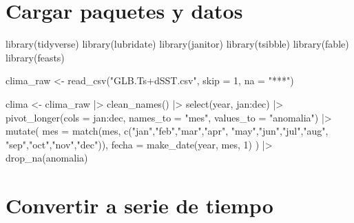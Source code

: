 \documentclass[
  letterpaper,
  DIV=11,
  numbers=noendperiod]{scrreprt}
\newenvironment{Shaded}{\begin{snugshade}}{\end{snugshade}}
\newcommand{\AttributeTok}[1]{\textcolor[rgb]{0.40,0.45,0.13}{#1}}
\newcommand{\DecValTok}[1]{\textcolor[rgb]{0.68,0.00,0.00}{#1}}
\newcommand{\FunctionTok}[1]{\textcolor[rgb]{0.28,0.35,0.67}{#1}}
\newcommand{\NormalTok}[1]{\textcolor[rgb]{0.00,0.23,0.31}{#1}}
\newcommand{\OtherTok}[1]{\textcolor[rgb]{0.00,0.23,0.31}{#1}}
\newcommand{\SpecialCharTok}[1]{\textcolor[rgb]{0.37,0.37,0.37}{#1}}
\newcommand{\StringTok}[1]{\textcolor[rgb]{0.13,0.47,0.30}{#1}}
\begin{document}
\section{Cargar paquetes y datos}\label{cargar-paquetes-y-datos-2}

\begin{Shaded}
\begin{Highlighting}[]
\FunctionTok{library}\NormalTok{(tidyverse)}
\FunctionTok{library}\NormalTok{(lubridate)}
\FunctionTok{library}\NormalTok{(janitor)}
\FunctionTok{library}\NormalTok{(tsibble)}
\FunctionTok{library}\NormalTok{(fable)}
\FunctionTok{library}\NormalTok{(feasts)}

\NormalTok{clima\_raw }\OtherTok{\textless{}{-}} \FunctionTok{read\_csv}\NormalTok{(}\StringTok{"GLB.Ts+dSST.csv"}\NormalTok{, }\AttributeTok{skip =} \DecValTok{1}\NormalTok{, }\AttributeTok{na =} \StringTok{"***"}\NormalTok{)}

\NormalTok{clima }\OtherTok{\textless{}{-}}\NormalTok{ clima\_raw }\SpecialCharTok{|\textgreater{}}
  \FunctionTok{clean\_names}\NormalTok{() }\SpecialCharTok{|\textgreater{}}
  \FunctionTok{select}\NormalTok{(year, jan}\SpecialCharTok{:}\NormalTok{dec) }\SpecialCharTok{|\textgreater{}}
  \FunctionTok{pivot\_longer}\NormalTok{(}\AttributeTok{cols =}\NormalTok{ jan}\SpecialCharTok{:}\NormalTok{dec,}
               \AttributeTok{names\_to  =} \StringTok{"mes"}\NormalTok{,}
               \AttributeTok{values\_to =} \StringTok{"anomalia"}\NormalTok{) }\SpecialCharTok{|\textgreater{}}
  \FunctionTok{mutate}\NormalTok{(}
    \AttributeTok{mes   =} \FunctionTok{match}\NormalTok{(mes, }\FunctionTok{c}\NormalTok{(}\StringTok{"jan"}\NormalTok{,}\StringTok{"feb"}\NormalTok{,}\StringTok{"mar"}\NormalTok{,}\StringTok{"apr"}\NormalTok{,}
                         \StringTok{"may"}\NormalTok{,}\StringTok{"jun"}\NormalTok{,}\StringTok{"jul"}\NormalTok{,}\StringTok{"aug"}\NormalTok{,}
                         \StringTok{"sep"}\NormalTok{,}\StringTok{"oct"}\NormalTok{,}\StringTok{"nov"}\NormalTok{,}\StringTok{"dec"}\NormalTok{)),}
    \AttributeTok{fecha =} \FunctionTok{make\_date}\NormalTok{(year, mes, }\DecValTok{1}\NormalTok{)}
\NormalTok{  ) }\SpecialCharTok{|\textgreater{}}
  \FunctionTok{drop\_na}\NormalTok{(anomalia)}
\end{Highlighting}
\end{Shaded}

\section{Convertir a serie de tiempo}\label{convertir-a-serie-de-tiempo}
\end{document}

